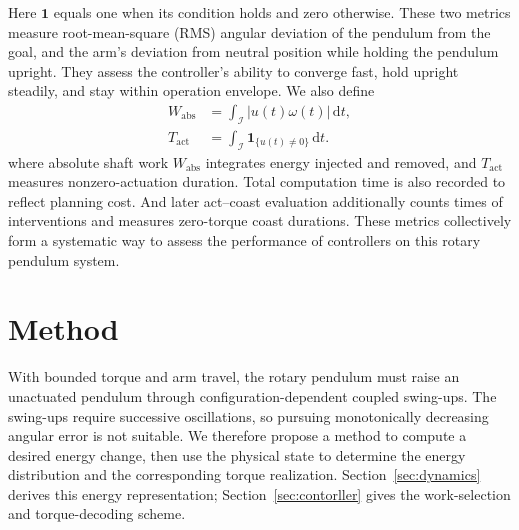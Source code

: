 \documentclass[letterpaper,10pt,conference]{ieeeconf}
\newcommand{\victor}[1]{{\color{navyblue}#1}}
\newcommand{\dd}{\mathrm{d}}
\newcommand{\ind}{\mathbf{1}}
\begin{document}
Here $\ind$ equals one when its condition holds and zero otherwise. These two metrics measure root-mean-square (RMS) angular deviation of the pendulum from the goal, and the arm's deviation from neutral position while holding the pendulum upright. They assess the controller's ability to converge fast, hold upright steadily, and stay within operation envelope. We also define
\begin{equation}
\begin{aligned}
 W_{\mathrm{abs}}&=\int_{\mathcal I}|u(t)\omega(t)|\,\dd t,\\
 T_{\mathrm{act}}&=\int_{\mathcal I}\ind_{\{u(t)\neq0\}}\,\dd t.
\end{aligned}
\label{eq:resourcemetrics}
\end{equation}
where absolute shaft work $W_{\mathrm{abs}}$ integrates energy injected and removed, and $T_{\mathrm{act}}$ measures nonzero-actuation duration. Total computation time is also recorded to reflect planning cost. \victor{And later act--coast evaluation additionally counts times of interventions and measures zero-torque coast durations.} These metrics collectively form a systematic way to assess the performance of controllers on this rotary pendulum system.










\section{Method}
With bounded torque and arm travel, the rotary pendulum must raise an unactuated pendulum through configuration-dependent coupled swing-ups. The swing-ups require successive oscillations, so pursuing monotonically decreasing angular error is not suitable. We therefore propose a method to compute a desired energy change, then use the physical state to determine the energy distribution and the corresponding torque realization. Section~\ref{sec:dynamics} derives this energy representation; Section~\ref{sec:contorller} gives the work-selection and torque-decoding scheme.
\end{document}
